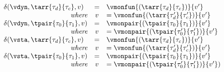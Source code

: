 {\flushleft

\medskip
{}
\begin{mathpar}



\end{mathpar}



$\begin{array}{l c l}
  \delta(\vdyn, \tarr{\tau_d}{\tau_c}, v) & = & \vmonfun{(\tarr{\tau_d}{\tau_c})}{v'}
\\\hfill\emph{where} & v & = \vmonfun{(\tarr{\tau_d'}{\tau_c'})}{v'}
\\
  \delta(\vdyn, \tpair{\tau_0}{\tau_1}, v) & = & \vmonpair{(\tpair{\tau_0}{\tau_1})}{v'}
\\\hfill\emph{where} & v & = \vmonpair{(\tpair{\tau_0'}{\tau_1'})}{v'}
\\
  \delta(\vsta, \tarr{\tau_d}{\tau_c}, v) & = & \vmonfun{(\tarr{\tau_d}{\tau_c})}{v'}
\\\hfill\emph{where} & v & = \vmonfun{(\tarr{\tau_d'}{\tau_c'})}{v'}
\\
  \delta(\vsta, \tpair{\tau_0}{\tau_1}, v) & = & \vmonpair{(\tpair{\tau_0}{\tau_1})}{v'}
\\\hfill\emph{where} & v & = \vmonpair{(\tpair{\tau_0'}{\tau_1'})}{v'})
\end{array}$

\medskip
\begin{minipage}{0.5\columnwidth}
\begin{mathpar}
\end{mathpar}
\end{minipage}%
\begin{minipage}{0.5\columnwidth}
\begin{mathpar}
\end{mathpar}
\end{minipage}
}
